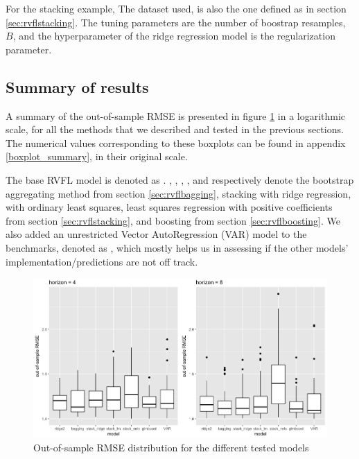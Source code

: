For the stacking example, The dataset used, is also the one defined as  in section \ref{sec:rvflstacking}. The tuning parameters are the number of boostrap resamples, $B$, and the hyperparameter of the ridge regression model is the regularization parameter. 

\subsection{Summary of results}
\label{results_summary}

A summary of the out-of-sample RMSE is presented in figure \ref{boxplot_perfs} in a logarithmic scale, for all the methods that we described and tested in the previous sections. The numerical values corresponding to these boxplots can be found in appendix \ref{boxplot_summary}, in their original scale. 

The base RVFL model is denoted as . , , , , and  respectively denote the bootstrap aggregating method from section \ref{sec:rvflbagging}, stacking with ridge regression, with ordinary least squares, least squares regression with positive coefficients from section \ref{sec:rvflstacking}, and boosting from section \ref{sec:rvflboosting}. We also added an unrestricted Vector AutoRegression (VAR) model to the benchmarks, denoted as , which mostly helps us in assessing if the other models' implementation/predictions are not off track.  

\begin{figure}[!htb]
\centering
\includegraphics[width=14cm]{gfx/chapter-rvfl-ensembles/boxplot_perfs.png}
\caption{Out-of-sample RMSE distribution for the different tested models}
\label{boxplot_perfs}
\end{figure}

